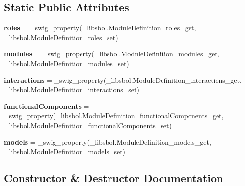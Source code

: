 \subsection*{Static Public Attributes}
\begin{DoxyCompactItemize}
\item 
{\bfseries roles} = \+\_\+swig\+\_\+property(\+\_\+libsbol.\+Module\+Definition\+\_\+roles\+\_\+get, \+\_\+libsbol.\+Module\+Definition\+\_\+roles\+\_\+set)\hypertarget{classsbol_1_1libsbol_1_1_module_definition_ad148da94e2f436f3c1ffea6e014b5e69}{}\label{classsbol_1_1libsbol_1_1_module_definition_ad148da94e2f436f3c1ffea6e014b5e69}

\item 
{\bfseries modules} = \+\_\+swig\+\_\+property(\+\_\+libsbol.\+Module\+Definition\+\_\+modules\+\_\+get, \+\_\+libsbol.\+Module\+Definition\+\_\+modules\+\_\+set)\hypertarget{classsbol_1_1libsbol_1_1_module_definition_a73661dd5c57ed87e5a71d8b11dabc9a3}{}\label{classsbol_1_1libsbol_1_1_module_definition_a73661dd5c57ed87e5a71d8b11dabc9a3}

\item 
{\bfseries interactions} = \+\_\+swig\+\_\+property(\+\_\+libsbol.\+Module\+Definition\+\_\+interactions\+\_\+get, \+\_\+libsbol.\+Module\+Definition\+\_\+interactions\+\_\+set)\hypertarget{classsbol_1_1libsbol_1_1_module_definition_a83c6cdf559f6ecf2423ed5c0d71c427a}{}\label{classsbol_1_1libsbol_1_1_module_definition_a83c6cdf559f6ecf2423ed5c0d71c427a}

\item 
{\bfseries functional\+Components} = \+\_\+swig\+\_\+property(\+\_\+libsbol.\+Module\+Definition\+\_\+functional\+Components\+\_\+get, \+\_\+libsbol.\+Module\+Definition\+\_\+functional\+Components\+\_\+set)\hypertarget{classsbol_1_1libsbol_1_1_module_definition_a497d48f12548a91ce2012a2b0c27fea8}{}\label{classsbol_1_1libsbol_1_1_module_definition_a497d48f12548a91ce2012a2b0c27fea8}

\item 
{\bfseries models} = \+\_\+swig\+\_\+property(\+\_\+libsbol.\+Module\+Definition\+\_\+models\+\_\+get, \+\_\+libsbol.\+Module\+Definition\+\_\+models\+\_\+set)\hypertarget{classsbol_1_1libsbol_1_1_module_definition_a9798d2e776acbecc3a5a4bed51695b80}{}\label{classsbol_1_1libsbol_1_1_module_definition_a9798d2e776acbecc3a5a4bed51695b80}

\end{DoxyCompactItemize}


\subsection{Constructor \& Destructor Documentation}
